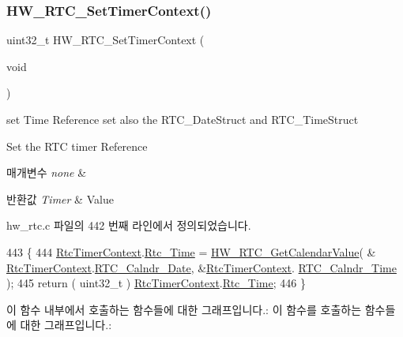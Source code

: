 \subsubsection{\texorpdfstring{H\+W\+\_\+\+R\+T\+C\+\_\+\+Set\+Timer\+Context()}{HW\_RTC\_SetTimerContext()}}
{\footnotesize\ttfamily uint32\+\_\+t H\+W\+\_\+\+R\+T\+C\+\_\+\+Set\+Timer\+Context (\begin{DoxyParamCaption}\item[{void}]{ }\end{DoxyParamCaption})}



set Time Reference set also the R\+T\+C\+\_\+\+Date\+Struct and R\+T\+C\+\_\+\+Time\+Struct 

Set the R\+TC timer Reference


\begin{DoxyParams}{매개변수}
{\em none} & \\
\hline
\end{DoxyParams}

\begin{DoxyRetVals}{반환값}
{\em Timer} & Value \\
\hline
\end{DoxyRetVals}


hw\+\_\+rtc.\+c 파일의 442 번째 라인에서 정의되었습니다.


\begin{DoxyCode}
443 \{
444   \mbox{\hyperlink{hw__rtc_8c_a0e042f0e024135713eeb5896d77a2356}{RtcTimerContext}}.\mbox{\hyperlink{struct_rtc_timer_context__t_a05f48439ba05c77e6271805cff79760f}{Rtc\_Time}} = \mbox{\hyperlink{group___lory_s_d_k___r_t_c___functions_gaf81b8dc866a5c7b125355b55e3953387}{HW\_RTC\_GetCalendarValue}}( &
      \mbox{\hyperlink{hw__rtc_8c_a0e042f0e024135713eeb5896d77a2356}{RtcTimerContext}}.\mbox{\hyperlink{struct_rtc_timer_context__t_a50959be607deb58750ba2eb2afaa7f46}{RTC\_Calndr\_Date}}, &\mbox{\hyperlink{hw__rtc_8c_a0e042f0e024135713eeb5896d77a2356}{RtcTimerContext}}.
      \mbox{\hyperlink{struct_rtc_timer_context__t_a605148ba4720b20b9ba2445a090a64d4}{RTC\_Calndr\_Time}} );
445   \textcolor{keywordflow}{return} ( uint32\_t ) \mbox{\hyperlink{hw__rtc_8c_a0e042f0e024135713eeb5896d77a2356}{RtcTimerContext}}.\mbox{\hyperlink{struct_rtc_timer_context__t_a05f48439ba05c77e6271805cff79760f}{Rtc\_Time}};
446 \}
\end{DoxyCode}
이 함수 내부에서 호출하는 함수들에 대한 그래프입니다.\+:
이 함수를 호출하는 함수들에 대한 그래프입니다.\+:
\mbox{\label{group___lory_s_d_k___r_t_c___functions_ga60703fcfc4abd73a2efc980e8bb6ad27}} 
